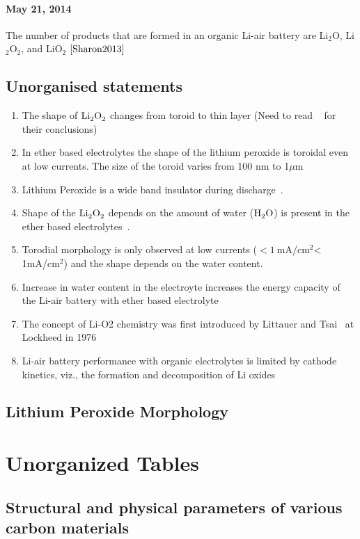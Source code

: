 \documentclass[12pt]{book}
\begin{document}
\paragraph*{May 21, 2014}
The number of products that are formed in an organic Li-air battery are Li$_2$O, Li$_2$O$_2$, and LiO$_2$ ${\cite{Sharon2013}}$
\subsection{Unorganised statements}
\begin{enumerate}
	\item The shape of $\ce{Li2O2}$ changes from toroid to thin layer (Need to read ~\cite{Aetukuri2015} for their conclusions)
	\item In ether based electrolytes the shape of the lithium peroxide is toroidal even at low currents. The size of the toroid varies from 100 nm to 1$\mu$m
	\item Lithium Peroxide is a wide band insulator during discharge~\cite{Aetukuri2015}.
	\item Shape of the $\ce{Li2O2}$ depends on the amount of water ($\ce{H2O}$) is present in the ether based electrolytes~\cite{Aetukuri2015}.
	\item Torodial morphology is only observed at low currents ($<\SI{1}{\milli\ampere\per\centi\meter\squared}$< 1mA/cm$^2$) and the shape depends on the water content.
	\item Increase in water content in the electroyte increases the energy capacity of the Li-air battery with ether based electrolyte
	\item The concept of Li-O2 chemistry was first introduced by Littauer and Tsai~\cite{Littauer1976} at Lockheed in 1976~\cite{Bhatt2014}
	\item Li-air battery performance with organic electrolytes is limited by cathode kinetics, viz., the formation and decomposition of Li oxides~\cite{Zhang2011e}
\end{enumerate}
\subsection{Lithium Peroxide Morphology}
 



\section{Unorganized Tables}
\subsection{Structural and physical parameters of various carbon materials} 
\end{document}
